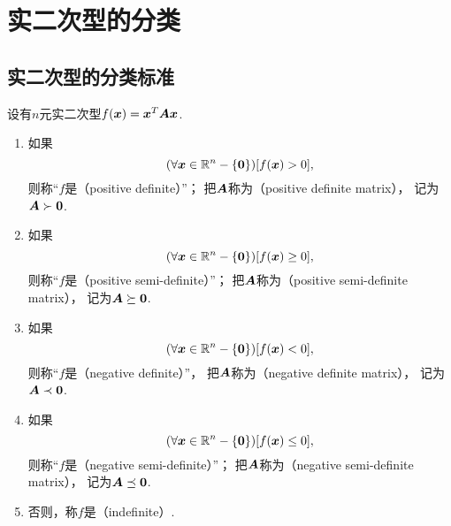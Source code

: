 \section{实二次型的分类}
\subsection{实二次型的分类标准}
\begin{definition}\label{definition:实二次型的分类.实二次型的分类}
设有\(n\)元实二次型\(f(\boldsymbol{x}) = \boldsymbol{x}^T\boldsymbol{A}\boldsymbol{x}\).
\begin{enumerate}
	\item 如果\begin{equation*}
		(\forall\boldsymbol{x}\in\mathbb{R}^n-\{\boldsymbol0\})
		[f(\boldsymbol{x}) > 0],
	\end{equation*}
	则称“\(f\)是（positive definite）”；
	把\(\boldsymbol{A}\)称为（positive definite matrix），
	记为\(\boldsymbol{A}\succ\boldsymbol0\).

	\item 如果\begin{equation*}
		(\forall\boldsymbol{x}\in\mathbb{R}^n-\{\boldsymbol0\})
		[f(\boldsymbol{x}) \geq 0],
	\end{equation*}
	则称“\(f\)是（positive semi-definite）”；
	把\(\boldsymbol{A}\)称为（positive semi-definite matrix），
	记为\(\boldsymbol{A}\succeq\boldsymbol0\).

	\item 如果\begin{equation*}
		(\forall\boldsymbol{x}\in\mathbb{R}^n-\{\boldsymbol0\})
		[f(\boldsymbol{x}) < 0],
	\end{equation*}
	则称“\(f\)是（negative definite）”，
	把\(\boldsymbol{A}\)称为（negative definite matrix），
	记为\(\boldsymbol{A}\prec\boldsymbol0\).

	\item 如果\begin{equation*}
		(\forall\boldsymbol{x}\in\mathbb{R}^n-\{\boldsymbol0\})
		[f(\boldsymbol{x}) \leq 0],
	\end{equation*}
	则称“\(f\)是（negative semi-definite）”；
	把\(\boldsymbol{A}\)称为（negative semi-definite matrix），
	记为\(\boldsymbol{A}\preceq\boldsymbol0\).

	\item 否则，称\(f\)是（indefinite）.
\end{enumerate}
\end{definition}

